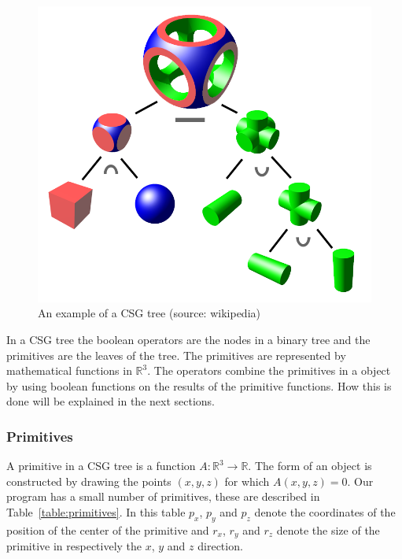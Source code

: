 \documentclass[a4paper,10pt,twocolumn]{article}
\begin{document}
    \begin{figure}[h]
        \begin{center}
            \includegraphics[scale=.2]{./images/csgtree.png}
        \end{center}
        \caption{An example of a CSG tree (source: wikipedia\cite{img:wiki_csg_tree})}
        \label{figure:csg_tree}
    \end{figure}

    In a CSG tree the boolean operators are the nodes in a binary tree and the primitives are the leaves of the tree. The primitives are represented by mathematical functions in $\mathbb{R}^3$. The operators combine the primitives in a object by using boolean functions on the results of the primitive functions. How this is done will be explained in the next sections.\\

\subsubsection{Primitives}
    A primitive in a CSG tree is a function $A:\mathbb{R}^3 \rightarrow \mathbb{R}$. The form of an object is constructed by drawing the points $(x,y,z)$ for which $A(x,y,z)=0$. Our program has a small number of primitives, these are described in Table~\ref{table:primitives}. In this table $p_x$, $p_y$ and $p_z$ denote the coordinates of the position of the center of the primitive and $r_x$, $r_y$ and $r_z$ denote the size of the primitive in respectively the $x$, $y$ and $z$ direction.\\
\end{document}
